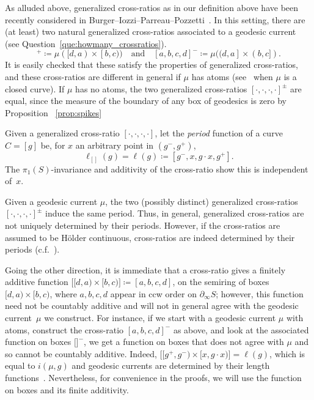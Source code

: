 As alluded above, generalized cross-ratios as in our definition above have been recently considered in Burger--Iozzi--Parreau--Pozzetti~\cite{BIPP24:PositiveCrossratios}.
In this setting, there are (at least) two natural generalized cross-ratios associated to a geodesic current (see Question~\ref{que:howmany_crossratios}).
\begin{equation}
[a,b,c,d]^+ \coloneqq \mu([d,a) \times [b,c))
\quad\text{and}\quad
[a,b,c,d]^- \coloneqq \mu((d,a] \times (b,c]).
\label{eq:current_to_crossratio}
\end{equation}
It is easily checked that these satisfy the properties of generalized cross-ratios,
and these cross-ratios are different in general if $\mu$ has atoms (see~\cite[Example~3.4]{BIPP24:PositiveCrossratios} when $\mu$ is a closed curve).
If $\mu$ has no atoms, the two generalized cross-ratios $[\cdot,\cdot,\cdot,\cdot]^{\pm}$ are equal, since the measure of the boundary of any box of geodesics is zero by Proposition~  \ref{prop:spikes}

Given a generalized cross-ratio $[ \cdot, \cdot, \cdot, \cdot ]$, let
the \emph{period} function of a curve $C=[g]$ be, for $x$ an arbitrary
point in $(g^-,g^+)$,
\[
  \ell_{[]}(g) = \ell(g) \coloneqq [g^-, x , g \cdot x, g^+].
\]
The $\pi_1(S)$-invariance and additivity of the cross-ratio show this is independent of~$x$.

Given a geodesic current $\mu$, the two (possibly distinct)
generalized cross-ratios $[ \cdot, \cdot, \cdot, \cdot ]^{\pm}$ induce
the same period. Thus, in general, generalized cross-ratios are not
uniquely determined by their periods. However, if the cross-ratios are
assumed to be H\"older continuous, cross-ratios are indeed determined
by their periods \cite[Theorem 1.f]{L95:BordDesVar} (c.f.\
\cite{Ot92:Symplectique}).

Going the other direction, it is immediate that a cross-ratio gives a
finitely additive function $\bigl[[d,a) \times [b,c)\bigr]\coloneqq [a,b,c,d]$, on the semiring of boxes $[d,a) \times [b,c)$, where $a,b,c,d$ appear in ccw
order on $\partial_\infty S$; however, this function need not be countably additive and will
not in general agree with the geodesic current~$\mu$ we construct. For
instance, if we start with a geodesic current $\mu$ with atoms,
construct the cross-ratio $[a,b,c,d]^-$ as above, and look at the
associated function on boxes $\bigl[ \bigr]^-$, we get a function on boxes that
does not agree with $\mu$ and so cannot be countably additive. Indeed,
 $\bigl[[g^+,g^-)\times [x,g \cdot x)\bigr]=\ell(g)$, which is equal to $i(\mu,g)$ and geodesic
currents are determined by their length functions~\cite{Otal90:SpectreMarqueNegative}. Nevertheless, for
convenience in the proofs, we will use the function on boxes and its finite additivity.

